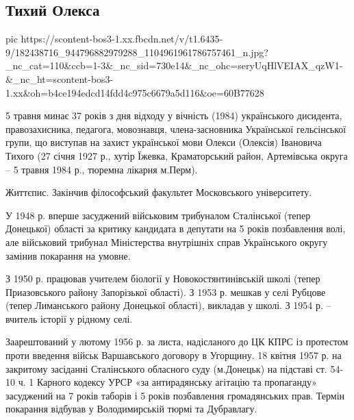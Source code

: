  
 
 
 
 
\subsection{Тихий Олекса}

\ifcmt
  pic https://scontent-bos3-1.xx.fbcdn.net/v/t1.6435-9/182438716_944796882979288_1104961961786757461_n.jpg?_nc_cat=110&ccb=1-3&_nc_sid=730e14&_nc_ohc=seryUqHlVEIAX_qzW1-&_nc_ht=scontent-bos3-1.xx&oh=b4ce194edcd14fdd4c975c6679a5d116&oe=60B77628
\fi

5 травня минає 37 років з дня відходу у вічність (1984) українського дисидента,
правозахисника, педагога, мовознавця, члена-засновника Української гельсінської
групи, що виступав на захист української мови Олекси (Олексія) Івановича Тихого
(27 січня 1927 р., хутір Їжевка, Краматорський район, Артемівська округа – 5
травня 1984 р., тюремна лікарня м.Перм).

Життєпис. Закінчив філософський факультет Московського університету.

У 1948 р. вперше засуджений військовим трибуналом Сталінської (тепер Донецької)
області за критику кандидата в депутати на 5 років позбавлення волі, але
військовий трибунал Міністерства внутрішніх справ Українського округу замінив
покарання на умовне.

З 1950 р. працював учителем біології у Новокостянтинівській школі (тепер
Приазовського району Запорізької області). З 1953 р. мешкав у селі Рубцове
(тепер Лиманського району Донецької області), викладав у школі. З 1954 р. –
вчитель історії у рідному селі.

Заарештований у лютому 1956 р. за листа, надісланого до ЦК КПРС із протестом
проти введення військ Варшавського договору в Угорщину. 18 квітня 1957 р. на
закритому засіданні Сталінського обласного суду (м.Донецьк) на підставі ст.
54-10 ч. 1 Карного кодексу УРСР «за антирадянську агітацію та пропаганду»
засуджений на 7 років таборів і 5 років позбавлення громадянських прав. Термін
покарання відбував у Володимирській тюрмі та Дубравлагу.

